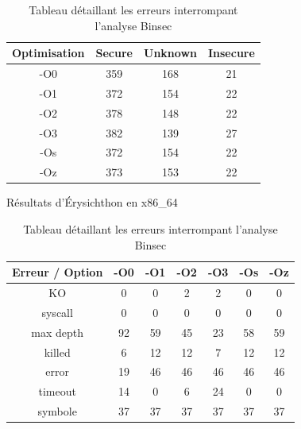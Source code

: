 \newpage
\begin{table}[!th]
\centering
\begin{adjustwidth}{-20mm}{0mm}
\begin{minipage}{0.48\textwidth}
    \centering
    \begin{tabular}{c|ccc}
        \textbf{Optimisation} & \textbf{Secure} & \textbf{Unknown} & \textbf{Insecure} \\
        \hline
        \rowcolor{blue!5}
        -O0 & 359 & 168 & 21 \\
        -O1 & 372 & 154 & 22 \\
        \rowcolor{blue!5}
        -O2 & 378 & 148 & 22 \\
        -O3 & 382 & 139 & 27 \\
        \rowcolor{blue!5}
        -Os & 372 & 154 & 22 \\
        -Oz & 373 & 153 & 22 \\
    \end{tabular}
    \caption{Résultats d'Érysichthon en x86\_64}
    \label{tab:resultats_finaux}
\end{minipage}%
\hfill
\begin{minipage}{0.48\textwidth}
    \centering
    \begin{tabular}{c|cccccc}
        \textbf{Erreur / Option} & \textbf{-O0} & \textbf{-O1} & \textbf{-O2} & \textbf{-O3} & \textbf{-Os} & \textbf{-Oz} \\
        \hline
        \rowcolor{blue!5}
        KO        & 0  & 0  & 2  & 2  & 0  & 0  \\
        syscall   & 0  & 0  & 0  & 0  & 0  & 0  \\
        \rowcolor{blue!5}
        max depth & 92 & 59 & 45 & 23 & 58 & 59 \\
        killed    & 6  & 12 & 12 & 7  & 12 & 12 \\
        \rowcolor{blue!5}
        error     & 19 & 46 & 46 & 46 & 46 & 46 \\
        timeout   & 14 & 0  & 6  & 24 & 0  & 0  \\
        \rowcolor{blue!5}
        symbole    & 37 & 37 & 37 & 37 & 37 & 37 \\
    \end{tabular}
    \caption{Tableau détaillant les erreurs interrompant l'analyse Binsec}
    \label{table:detail_unknown}
\end{minipage}
\end{adjustwidth}
\end{table}

